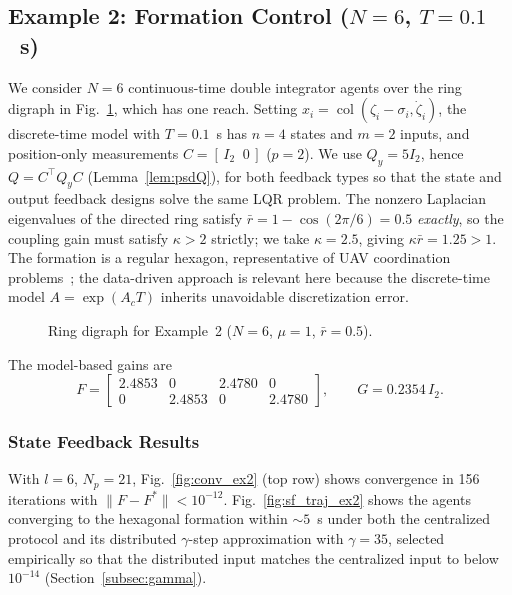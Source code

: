 \documentclass[final,5p,times]{elsarticle}
\theoremstyle{plain}
\theoremstyle{definition}
\theoremstyle{remark}
\DeclareMathOperator{\col}{col}
\begin{document}
\subsection{Example 2: Formation Control (\texorpdfstring{$N = 6$, $T = 0.1$~s}{N = 6, T = 0.1 s})}
\label{subsec:sim2}
We consider $N = 6$ continuous-time double integrator agents over the ring digraph in Fig.~\ref{fig:graph6}, which has one reach. Setting $x_i = \col(\zeta_i - \sigma_i, \dot{\zeta}_i)$, the discrete-time model with $T = 0.1$~s has $n = 4$ states and $m = 2$ inputs, and position-only measurements $C = [\,I_2 \;\; 0\,]$ ($p = 2$). We use $Q_y = 5I_2$, hence $Q = C^\top Q_y C$ (Lemma~\ref{lem:psdQ}), for both feedback types so that the state and output feedback designs solve the same LQR problem. The nonzero Laplacian eigenvalues of the directed ring satisfy $\bar{r} = 1 - \cos(2\pi/6) = 0.5$ \emph{exactly}, so the coupling gain must satisfy $\kappa > 2$ strictly; we take $\kappa = 2.5$, giving $\kappa\bar{r} = 1.25 > 1$. The formation is a regular hexagon, representative of UAV coordination problems~\cite{dony2021distributed,dony2021robust}; the data-driven approach is relevant here because the discrete-time model $A = \exp(A_c T)$ inherits unavoidable discretization error.
\begin{figure}[!htbp]
\centering
{}
\caption{Ring digraph for Example~2 ($N=6$, $\mu=1$, $\bar{r}=0.5$).}
\label{fig:graph6}
\end{figure}
The model-based gains are
\begin{equation*}
F = \begin{bmatrix} 2.4853 & 0 & 2.4780 & 0 \\ 0 & 2.4853 & 0 & 2.4780 \end{bmatrix}, \qquad
G = 0.2354\, I_2 .
\end{equation*}
\subsubsection{State Feedback Results}
With $l = 6$, $N_p = 21$, Fig.~\ref{fig:conv_ex2} (top row) shows convergence in 156 iterations with $\|F - F^*\| < 10^{-12}$. Fig.~\ref{fig:sf_traj_ex2} shows the agents converging to the hexagonal formation within ${\sim}5$~s under both the centralized protocol and its distributed $\gamma$-step approximation with $\gamma = 35$, selected empirically so that the distributed input matches the centralized input to below $10^{-14}$ (Section~\ref{subsec:gamma}).
\end{document}
